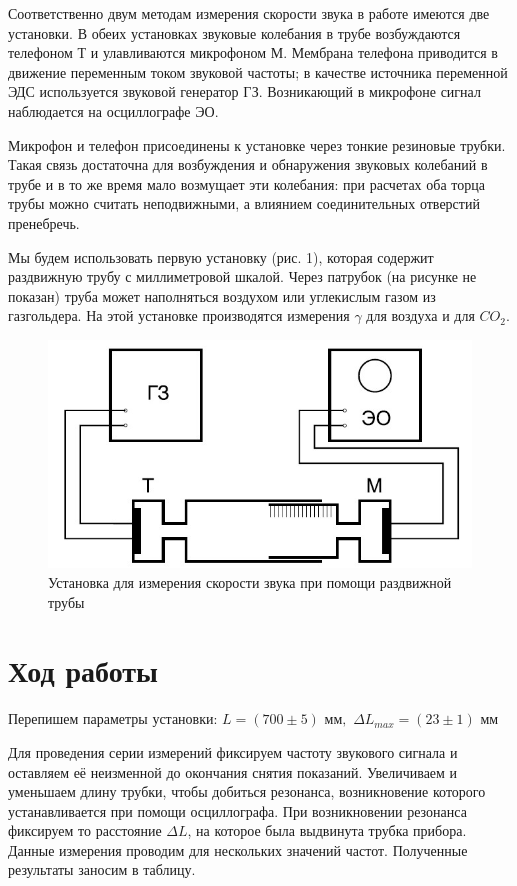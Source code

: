 \documentclass[a4paper,12pt]{article} %
\begin{document}
\noindent Соответственно двум методам измерения скорости звука в работе имеются две установки. В обеих установках звуковые колебания в трубе возбуждаются телефоном Т и улавливаются микрофоном М. Мембрана телефона приводится в движение переменным током звуковой частоты; в качестве источника переменной ЭДС используется звуковой генератор ГЗ. Возникающий в микрофоне сигнал наблюдается на осциллографе ЭО.

\medskip

\noindent Микрофон и телефон присоединены к установке через тонкие резиновые трубки. Такая связь достаточна для возбуждения и обнаружения звуковых колебаний в трубе и в то же время мало возмущает эти колебания: при расчетах оба торца трубы можно считать неподвижными, а влиянием соединительных отверстий пренебречь.

\medskip

\noindent Мы будем использовать первую установку (рис. 1), которая содержит раздвижную трубу с миллиметровой шкалой. Через патрубок (на рисунке не показан) труба может наполняться воздухом или углекислым газом из газгольдера. На этой установке производятся измерения $ \gamma $ для воздуха и для $ CO_2 $.
 
\begin{figure}[!h]
 	\centering
 	\includegraphics[width=0.6\linewidth]{установка.jpg}
 	\caption[]{Установка для измерения скорости звука при помощи раздвижной трубы}
 	
 \end{figure}
	
\newpage

\section{Ход работы}

\noindent Перепишем параметры установки:
$L = (700\pm5) \text{ мм},$  $\Delta L_{max} = (23 \pm1) \text{ мм}$
		
\medskip

\noindent Для проведения серии измерений фиксируем частоту звукового сигнала и оставляем её неизменной до окончания снятия показаний. Увеличиваем и уменьшаем длину трубки, чтобы добиться резонанса, возникновение которого устанавливается при помощи осциллографа. При возникновении резонанса фиксируем то расстояние $\Delta L$, на которое была выдвинута трубка прибора. Данные измерения проводим для нескольких значений частот. Полученные результаты заносим в таблицу.
\end{document}
